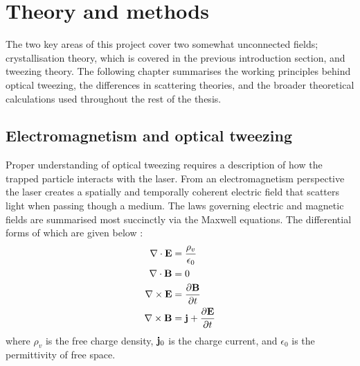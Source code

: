 \chapter{Theory and methods}
\label{chapter:theory}
The two key areas of this project cover two somewhat unconnected
fields; crystallisation theory, which is covered in the 
previous introduction section, and tweezing theory. The 
following chapter summarises the working principles behind 
optical tweezing, the differences in scattering theories, 
and the broader theoretical calculations used throughout the 
rest of the thesis.

\section{Electromagnetism and optical tweezing}

Proper understanding of optical tweezing requires a description
of how the trapped particle interacts with the laser. 
From an electromagnetism perspective the laser creates a 
spatially and temporally coherent electric field that scatters 
light when passing though a medium. The laws governing electric 
and magnetic fields are summarised most succinctly via the 
Maxwell equations. The differential forms of which are given 
below \cite{Jackson_1975}:
\begin{align}
  \nabla \cdot \mathbf{E}
  &= \frac{\rho_ v}{\epsilon_0}
  \label{eq:max_start}
  \\
  \nabla \cdot \mathbf{B}
  &= 0
  \\
  \nabla \times \mathbf{E}
  &= \frac{\partial \mathbf{B}}{\partial t}
  \\
  \nabla \times \mathbf{B}
  &= {\bf j} +\frac{\partial \mathbf{E}}{\partial t}
  \label{eq:max_end}    
\end{align}
where $\rho_v$ is the free charge density, ${\bf j}_0$ is the 
charge current, and $\epsilon_0$ is the permittivity of free 
space. 


